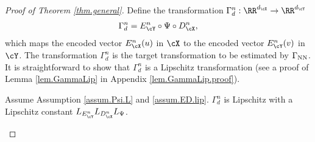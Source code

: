 \documentclass[11pt]{article} %
\begin{document}
\begin{proof}[Proof of Theorem \ref{thm.general}]
Define the transformation $\Gamma_{d}^n: \RR^{d_{\cX}}\rightarrow \RR^{d_{\cY}}$
\begin{align}
	\Gamma_d^n=E_{\cY}^n\circ \Psi\circ D_{\cX}^n,
	\label{eq.pid}
\end{align}
which maps the encoded vector  $E^n_{\cX}(u)$ in $\cX$ to the encoded vector  $E^n_{\cY}(v)$ in $\cY$.
The transformation $\Gamma_d^n$ is the target transformation to be estimated by $\Gamma_{\rm NN}$. 
It is straightforward to show that $\Gamma_d^n$ is a Lipschitz transformation (see a proof of Lemma \ref{lem.GammaLip} in Appendix \ref{lem.GammaLip.proof}).
\begin{lemma}\label{lem.GammaLip}
	Assume Assumption \ref{assum.Psi.L} and \ref{assum.ED.lip}. $\Gamma_d^n$ is Lipschitz with a Lipschitz constant $L_{E^n_{\cY}}L_{D^n_{\cX}}L_{\Psi}$.
\end{lemma}



\end{proof}
\end{document}
